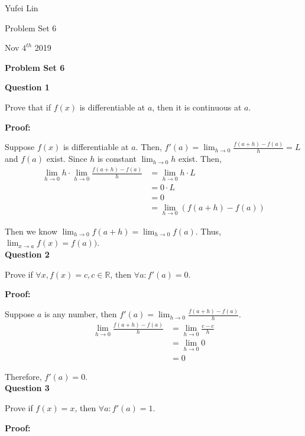 \documentclass[a4paper,12pt]{report}
\begin{document}
\noindent
Yufei Lin

\noindent
Problem Set 6

\noindent
Nov \(4^{th}\) 2019

\begin{center}
\textbf{Problem Set 6}
\end{center}

\noindent
\textbf{Question 1}

\noindent
Prove that if $f(x)$ is differentiable at $a$, then it is continuous at $a$.

\noindent
\textbf{Proof: }

\noindent
Suppose $f(x)$ is differentiable at $a$. Then, $f'(a)=\displaystyle{\lim_{h\to 0}}\frac{f(a+h)-f(a)}{h} = L$ and $f(a)$ exist. Since $h$ is constant $\displaystyle{\lim_{h\to 0}h}$ exist. Then,
\begin{align*}
\displaystyle{\lim_{h\to 0}h}\cdot{\displaystyle{\lim_{h\to 0}}\frac{f(a+h)-f(a)}{h}}
 & = \displaystyle{\lim_{h\to 0}h}\cdot{L}\\
 & = 0\cdot{L}\\
 & = 0\\
 &=\displaystyle{\lim_{h\to 0}(f(a+h)-f(a))}
\end{align*}

\noindent
Then we know $\displaystyle{\lim_{h\to 0}f(a+h)}=\displaystyle{\lim_{h\to 0}f(a)}$. Thus, $\displaystyle{\lim_{x\to a}f(x)=f(a))}$.\\

\noindent
\textbf{Question 2}

\noindent
Prove if $\forall x, f(x)=c, c\in \mathbb{R}$, then $\forall a: f'(a) = 0$.

\noindent
\textbf{Proof: }

\noindent
Suppose $a$ is any number, then $f'(a)=\displaystyle{\lim_{h\to 0}}\frac{f(a+h)-f(a)}{h}$.
\begin{align*}
\displaystyle{\lim_{h\to 0}}\frac{f(a+h)-f(a)}{h}
 & = \displaystyle{\lim_{h\to 0}\frac{c-c}{h}}\\
 & = \displaystyle{\lim_{h\to 0}0}\\
 & = 0
\end{align*}

\noindent
Therefore, $f'(a) = 0$.\\

\noindent
\textbf{Question 3}

\noindent
Prove if $f(x)=x$, then $\forall a: f'(a) = 1$.

\noindent
\textbf{Proof: }
\end{document}
